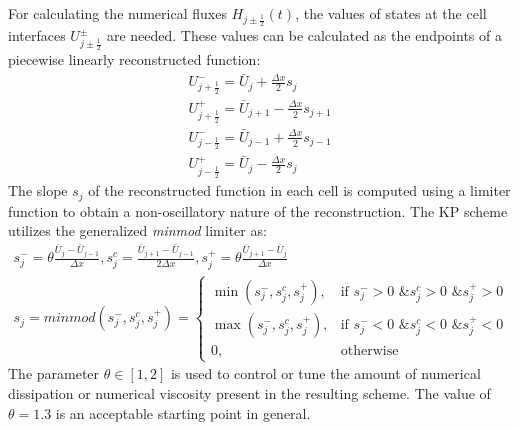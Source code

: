 \documentclass[%
]{USN-PhD}
\begin{document}
For calculating the numerical fluxes $H_{j\pm\frac{1}{2}}\left(t\right)$, the values of states at the cell interfaces $U^\pm_{j\pm\frac{1}{2}}$ are needed. These values can be calculated as the endpoints of a piecewise linearly reconstructed function:
\begin{equation}\label{eq:eq9}
\begin{array}{c}
U^-_{j+\frac{1}{2}}=\bar{U}_j+\frac{\Delta x}{2}s_j\\
U^+_{j+\frac{1}{2}}=\bar{U}_{j+1}-\frac{\Delta x}{2}s_{j+1}\\
U^-_{j-\frac{1}{2}}=\bar{U}_{j-1}+\frac{\Delta x}{2}s_{j-1}\\
U^+_{j-\frac{1}{2}}=\bar{U}_j-\frac{\Delta x}{2}s_j
\end{array}
\end{equation}
The slope $s_j$ of the reconstructed function in each cell is computed using a limiter function to obtain a non-oscillatory nature of the reconstruction. The KP scheme utilizes the generalized \emph{minmod} limiter as:
\begin{equation}\label{eq:eq10}
\begin{array}{c}
s_j^-=\theta\frac{\bar{U}_j-\bar{U}_{j-1}}{\Delta x},s_j^c=\frac{\bar{U}_{j+1}-\bar{U}_{j-1}}{2\Delta x},s_j^+=\theta\frac{\bar{U}_{j+1}-\bar{U}_{j}}{\Delta x}\\
s_j=minmod\left(s_j^-,s_j^c,s_j^+\right)=\begin{cases}
   \min\left(s_j^-,s_j^c,s_j^+\right), & \text{if }s_j^->0\text{ \& }s_j^c>0\text{ \& }s_j^+>0 \\
   \max\left(s_j^-,s_j^c,s_j^+\right), & \text{if }s_j^-<0\text{ \& }s_j^c<0\text{ \& }s_j^+<0 \\
   0, & \text{otherwise}
  \end{cases}
\end{array}
\end{equation}
The parameter $\theta\in[1,2]$ is used to control or tune the amount of numerical dissipation or numerical viscosity present in the resulting scheme. The value of $\theta = 1.3$ is an acceptable starting point in general.
\end{document}
